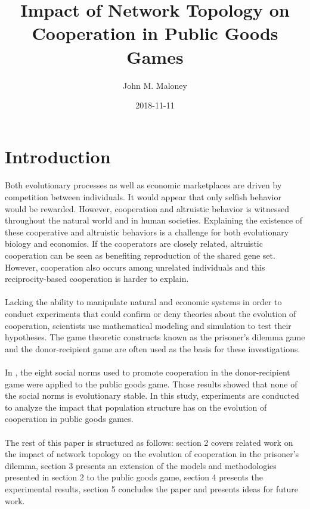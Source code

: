 \documentclass{article}
\title{Impact of Network Topology on Cooperation in Public Goods Games}
\date{2018-11-11}
\author{John M. Maloney}
\begin{document}
  \maketitle

  \section{Introduction}
  \paragraph{}Both evolutionary processes as well as economic marketplaces are driven by competition between individuals. It would appear that only selfish behavior would be rewarded.  However, cooperation and altruistic behavior is witnessed throughout the natural world and in human societies.  Explaining the existence of these cooperative and altruistic behaviors is a challenge for both evolutionary biology and economics.  If the cooperators are closely related, altruistic cooperation can be seen as benefiting reproduction of the shared gene set.  However, cooperation also occurs among unrelated individuals and this reciprocity-based cooperation is harder to explain.  
  \paragraph{}Lacking the ability to manipulate natural and economic systems in order to conduct experiments that could confirm or deny theories about the evolution of cooperation, scientists use mathematical modeling and simulation to test their hypotheses.  The game theoretic constructs known as the prisoner’s dilemma game and the donor-recipient game are often used as the basis for these investigations.
  \paragraph{}In \cite{Maloney2015a}, the eight social norms used to promote cooperation in the donor-recipient game \cite{Ohtsuki2006} were applied to the public goods game.  Those results showed that none of the social norms is evolutionary stable.  In this study, experiments are conducted to analyze the impact that population structure has on the evolution of cooperation in public goods games.
  \paragraph{}The rest of this paper is structured as follows:  section 2 covers related work on the impact of network topology on the evolution of cooperation in the prisoner’s dilemma, section 3 presents an extension of the models and methodologies presented in section 2 to the public goods game, section 4 presents the experimental results, section 5 concludes the paper and presents ideas for future work.
  
\end{document}
